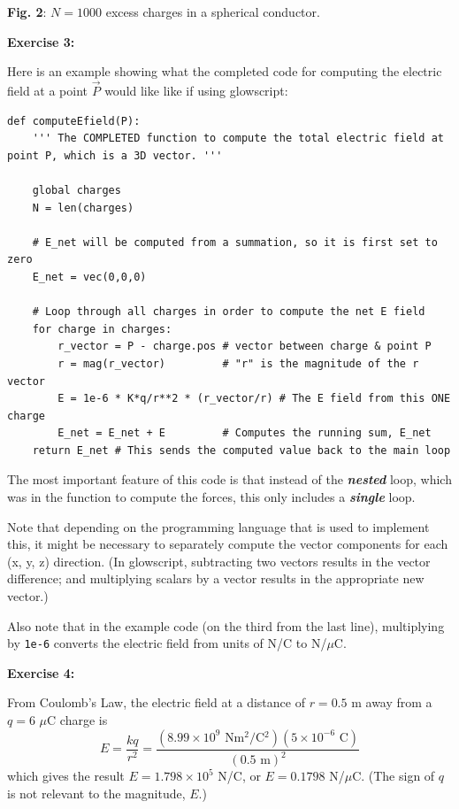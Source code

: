 \documentclass[]{article}
\begin{document}
\textbf{Fig. 2}: \(N = 1000\) excess charges in a spherical conductor.

\textbf{Exercise 3:}

Here is an example showing what the completed code for computing the
electric field at a point \(\vec{P}\) would like like if using
glowscript:

\begin{verbatim}
def computeEfield(P):
    ''' The COMPLETED function to compute the total electric field at point P, which is a 3D vector. '''
    
    global charges
    N = len(charges)
    
    # E_net will be computed from a summation, so it is first set to zero
    E_net = vec(0,0,0)
    
    # Loop through all charges in order to compute the net E field
    for charge in charges:
        r_vector = P - charge.pos # vector between charge & point P
        r = mag(r_vector)         # "r" is the magnitude of the r vector
        E = 1e-6 * K*q/r**2 * (r_vector/r) # The E field from this ONE charge
        E_net = E_net + E         # Computes the running sum, E_net
    return E_net # This sends the computed value back to the main loop
\end{verbatim}

The most important feature of this code is that instead of the
\textbf{\emph{nested}} loop, which was in the function to compute the
forces, this only includes a \textbf{\emph{single}} loop.

Note that depending on the programming language that is used to
implement this, it might be necessary to separately compute the vector
components for each (x, y, z) direction. (In glowscript, subtracting two
vectors results in the vector difference; and multiplying scalars by a
vector results in the appropriate new vector.)

Also note that in the example code (on the third from the last line),
multiplying by \texttt{1e-6} converts the electric field from units of
N/C to N/\(\mu\)C.

\textbf{Exercise 4:}

From Coulomb's Law, the electric field at a distance of \(r = 0.5\) m
away from a \(q=6\) \(\mu\)C charge is
\[E = \frac{kq}{r^2} = \frac{(8.99\times 10^9\textrm{ Nm$^2$/C$^2$})(5\times 10^{-6}\textrm{ C})}{(0.5\textrm{ m})^2}\]
which gives the result \(E = 1.798 \times 10^5\) N/C, or \(E = 0.1798\)
N/\(\mu\)C. (The sign of \(q\) is not relevant to the magnitude, \(E\).)
\end{document}
